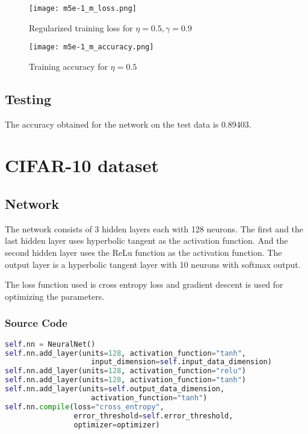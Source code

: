 \documentclass{article}
\begin{document}
\begin{figure}[!ht]
  \texttt{[image: m5e-1\_m\_loss.png]}
  \caption{Regularized training loss for $\eta = 0.5, \gamma = 0.9$}
  \label{fig:mnist_one_loss}
\end{figure}

\begin{figure}[!ht]
  \texttt{[image: m5e-1\_m\_accuracy.png]}
  \caption{Training accuracy for $\eta = 0.5$}
  \label{fig:mnist_one_accuracy}
\end{figure}

\subsection{Testing}
The accuracy obtained for the network on the test data is 0.89403.

\section {CIFAR-10 dataset}
\subsection{Network}
The network consists of 3 hidden layers each with 128 neurons.  The first and the last
hidden layer uses hyperbolic tangent as the activation function. And the second
hidden layer uses the ReLu function as the activation function. The output layer is
a hyperbolic tangent layer with 10 neurons with softmax output.

The loss function used is cross entropy loss and gradient descent is used for
optimizing the parameters.

\subsubsection{Source Code}
\begin{lstlisting}[language=python]
self.nn = NeuralNet()
self.nn.add_layer(units=128, activation_function="tanh",
                    input_dimension=self.input_data_dimension)
self.nn.add_layer(units=128, activation_function="relu")
self.nn.add_layer(units=128, activation_function="tanh")
self.nn.add_layer(units=self.output_data_dimension,
                    activation_function="tanh")
self.nn.compile(loss="cross_entropy",
                error_threshold=self.error_threshold,
                optimizer=optimizer)
\end{lstlisting}
\end{document}
